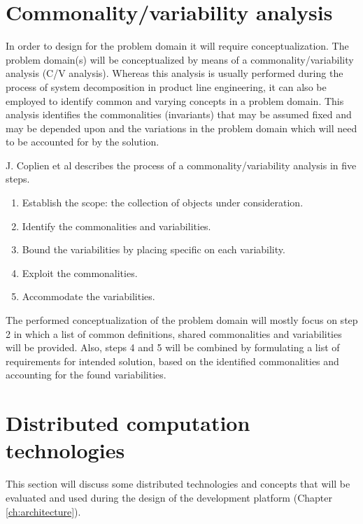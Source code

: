 \section{Commonality/variability analysis}
\label{sec:back:cv_analysis}
In order to design for the problem domain it will require conceptualization. The problem domain(s) will be conceptualized by means of a commonality/variability analysis (C/V analysis). Whereas this analysis is usually performed during the process of system decomposition in product line engineering, it can also be employed to identify common and varying concepts in a problem domain. This analysis identifies the commonalities (invariants) that may be assumed fixed and may be depended upon and the variations in the problem domain which will need to be accounted for by the solution.

J. Coplien et al \cite{cv_analysis} describes the process of a commonality/variability analysis in five steps.
\begin{enumerate}
\nospace
\item Establish the scope: the collection of objects under consideration.
\item Identify the commonalities and variabilities.
\item Bound the variabilities by placing specific on each variability.
\item Exploit the commonalities.
\item Accommodate the variabilities.
\end{enumerate}

The performed conceptualization of the problem domain will mostly focus on step 2 in which a list of common definitions, shared commonalities and variabilities will be provided. Also, steps 4 and 5 will be combined by formulating a list of requirements for intended solution, based on the identified commonalities and accounting for the found variabilities.

\section{Distributed computation technologies}
This section will discuss some distributed technologies and concepts that will be evaluated and used during the design of the development platform (Chapter \ref{ch:architecture}).
\label{sec:back:tech}
